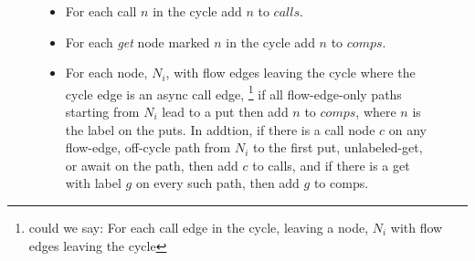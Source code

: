 \documentclass[12pt]{article}%
\begin{document}
\begin{figure}
\begin{shaded}
\begin{itemize}
\item For each call $n$ in the cycle add $n$ to $calls$.
\item For each \emph{get} node  marked   $n$ in the cycle add   $n$ to  $comps$.
\item For each node, $N_i$, with flow edges leaving the cycle where the cycle edge is an async call edge,%
\footnote{could we say:  
        For each call edge in the cycle,  leaving a node, $N_i$ with flow edges leaving the cycle }
if all flow-edge-only paths starting from $N_i$ lead to a put %
then add ${n}$ to $comps$,
where ${n}$ is the label on the puts. %
In addtion, if there is a call node $c$ on any flow-edge, off-cycle path from $N_i$ to the first put, unlabeled-get, or await on the path,
then add $c$ to calls, and
if there is a get with label $g$ on every such path, then add $g$ to comps.

\end{itemize}
\end{shaded}
\end{figure}
\end{document}
